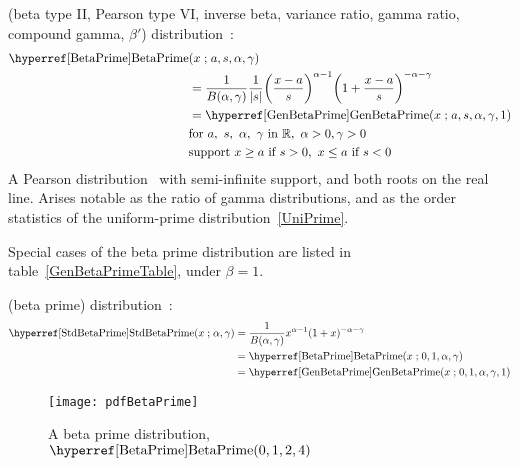 

\label{sec:BetaPrime}



 (beta type II, Pearson type VI, inverse beta, variance ratio, gamma ratio, compound gamma, $\beta'$) distribution~\cite{Pearson1901,Johnson1995}:
\begin{align}
\label{BetaPrime}
\opr{BetaPrime}&(x\given  a, s,\alpha, \gamma) \\ \notag&= \frac{1}{B(\alpha,\gamma)}\frac{1}{|s|} \Left(\frac{x-a}{s}\Right)^{\alpha -1} \Left(1+\frac{x-a}{s}\Right)^{-\alpha-\gamma }  \checked
\\
&= \opr{GenBetaPrime}(x\given a,s, \alpha,\gamma,1) \notag \checked
\\
& \text{for }  a,\ s,\ \alpha,\ \gamma \text{ in } \Real, \  \alpha>0, \gamma>0  \checked
\notag \\ 
& \text{support } x \geq a \ \text{if}\ s > 0,  \ x\leq a  \ \text{if}\  s < 0 
\notag
\end{align}
A Pearson distribution~ with semi-infinite support, and both roots on the real line. Arises notable as the ratio of gamma distributions, and as the order statistics of the uniform-prime distribution~\eqref{UniPrime}.



Special cases of the beta prime distribution are listed in table~\ref{GenBetaPrimeTable}, under $\beta=1$.


 (beta prime) distribution~\cite{Pearson1901}:
\begin{align}
\label{StdBetaPrime}
\opr{StdBetaPrime}(x\given \alpha, \gamma) &= \frac{1}{B(\alpha,\gamma)} x^{\alpha -1} (1+x )^{-\alpha-\gamma } \checked
\\&= \opr{BetaPrime}(x\given  0,1, \alpha,\gamma) \notag	\checked
\\&= \opr{GenBetaPrime}(x\given  0,1, \alpha,\gamma,1) \notag \checked
\end{align}


\begin{figure}[tp!]
\begin{center}
\texttt{[image: pdfBetaPrime]}
\end{center}
\caption[Beta prime distribution]{A beta prime distribution, $\opr{BetaPrime}(0, 1, 2, 4)$}
\end{figure}


